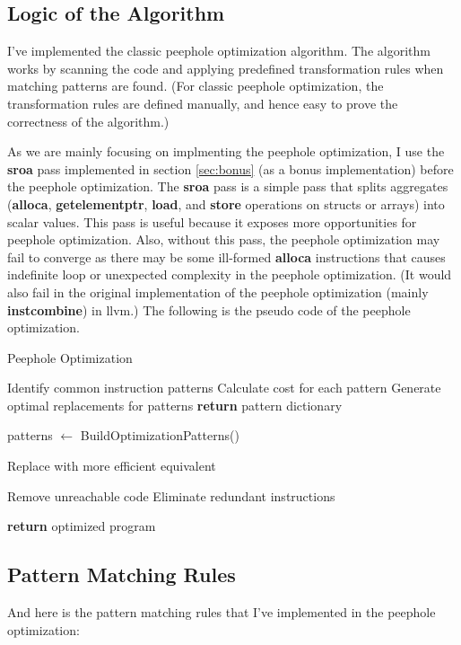 \documentclass[conference]{IEEEtran}
\begin{document}
\subsection{Logic of the Algorithm}
I've implemented the classic peephole optimization algorithm. The algorithm works by scanning the code and applying predefined transformation rules when matching patterns are found. (For classic peephole optimization, the transformation rules are defined manually, and hence easy to prove the correctness of the algorithm.)

As we are mainly focusing on implmenting the peephole optimization, I use the \textbf{sroa} pass implemented in section \ref{sec:bonus} (as a bonus implementation) before the peephole optimization. The \textbf{sroa} pass is a simple pass that splits aggregates (\textbf{alloca}, \textbf{getelementptr}, \textbf{load}, and \textbf{store} operations on structs or arrays) into scalar values. This pass is useful because it exposes more opportunities for peephole optimization. Also, without this pass, the peephole optimization may fail to converge as there may be some ill-formed \textbf{alloca} instructions that causes indefinite loop or unexpected complexity in the peephole optimization. (It would also fail in the original implementation of the peephole optimization (mainly \textbf{instcombine}) in llvm.) The following is the pseudo code of the peephole optimization.

\begin{algorithm}[H]
	\caption{Peephole Optimization}
	\begin{algorithmic}[1]
		\State Identify common instruction patterns
		\State Calculate cost for each pattern
		\State Generate optimal replacements for patterns
		\State \textbf{return} pattern dictionary
		\EndFunction

		\State patterns $\gets$ BuildOptimizationPatterns()

		\State Replace with more efficient equivalent
		\EndIf
		\EndFor

		\State Remove unreachable code
		\State Eliminate redundant instructions

		\State \textbf{return} optimized program
		\EndFunction
	\end{algorithmic}
\end{algorithm}

\subsection{Pattern Matching Rules}
And here is the pattern matching rules that I've implemented in the peephole optimization:
\end{document}
